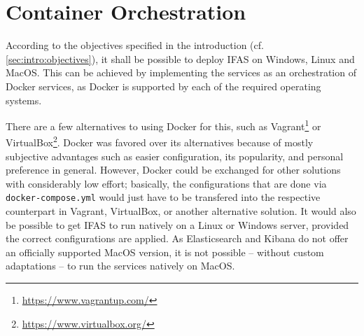 \section{Container Orchestration}
\label{sec:classification:orchestration}

According to the objectives specified in the introduction (cf. \cref{sec:intro:objectives}), it shall be possible to deploy \ac{IFAS} on Windows, Linux and MacOS.
This can be achieved by implementing the services as an orchestration of Docker services, as Docker is supported by each of the required operating systems.

There are a few alternatives to using Docker for this, such as Vagrant\footnote{\url{https://www.vagrantup.com/}} or VirtualBox\footnote{\url{https://www.virtualbox.org/}}.
Docker was favored  over its alternatives because of mostly subjective advantages such as easier configuration, its popularity, and personal preference in general.
However, Docker could be exchanged for other solutions with considerably low effort; basically, the configurations that are done via \texttt{docker-compose.yml} would just have to be transfered into the respective counterpart in Vagrant, VirtualBox, or another alternative solution.
It would also be possible to get \ac{IFAS} to run natively on a Linux or Windows server, provided the correct configurations are applied.
As Elasticsearch and Kibana do not offer an officially supported MacOS version, it is not possible -- without custom adaptations -- to run the services natively on MacOS.
